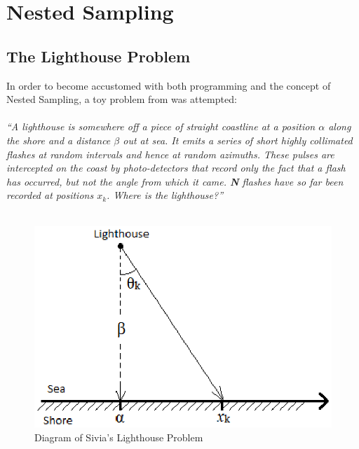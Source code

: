 \documentclass[a4paper,12pt]{article}
\begin{document}

\newpage

\section{Nested Sampling}
\subsection{The Lighthouse Problem}
In order to become accustomed with both programming and the concept of Nested Sampling, a toy problem from \cite{sivia} was attempted: \\ \\
\textit{``A lighthouse is somewhere off a piece of straight coastline at a position $\alpha$ along the shore and a distance $\beta$ out at sea. It emits a series of short highly collimated flashes at random intervals and hence at random azimuths. These pulses are intercepted on the coast by photo-detectors that record only the fact that a flash has occurred, but not the angle from which it came. \textbf{N} flashes have so far been recorded at positions $x_{k}$. Where is the lighthouse?''}\cite{sivia}
\\ \\



\begin{figure}[!h]
 \begin{center}
  \includegraphics[scale=0.75]{lighthouse.eps}
  \caption{Diagram of Sivia's Lighthouse Problem \cite{sivia}}
 \end{center}
\end{figure}
\end{document}
